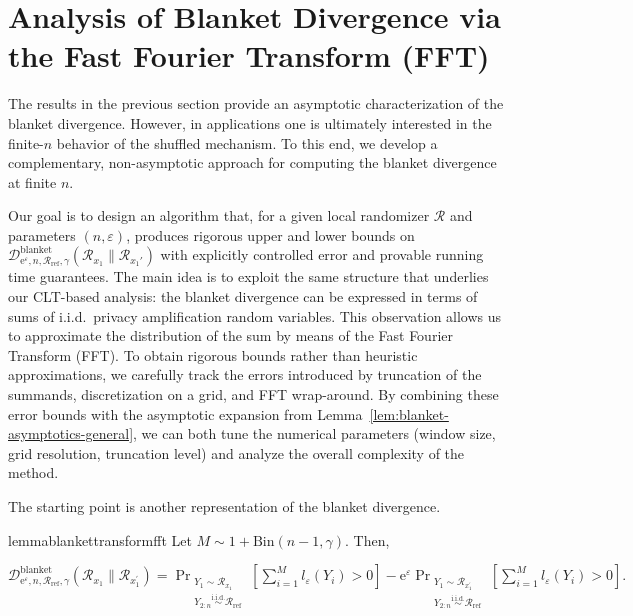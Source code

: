 \documentclass{article}
\theoremstyle{plain}
\theoremstyle{definition}
\begin{document}
\section{Analysis of Blanket Divergence via the Fast Fourier Transform (FFT)}

The results in the previous section provide an asymptotic characterization of the blanket divergence. 
However, in applications one is ultimately interested in the finite-$n$ behavior of the shuffled mechanism.
To this end, we develop a complementary, non-asymptotic approach for computing the blanket divergence at finite $n$.


Our goal is to design an algorithm that, for a given local randomizer
$\mathcal R$ and parameters $(n,\varepsilon)$, produces rigorous upper and
lower bounds on
$\mathcal D^{\mathrm{blanket}}_{\mathrm e^\varepsilon,n,\mathcal R_{\mathrm{ref}},\gamma}
(\mathcal R_{x_1}\|\mathcal R_{x_1'})$ with explicitly controlled error and
provable running time guarantees. 
The main idea is to exploit the same
structure that underlies our CLT-based analysis: the blanket divergence can be
expressed in terms of sums of i.i.d.\ privacy amplification random variables.
This observation allows us to approximate the distribution of the sum by means
of the Fast Fourier Transform (FFT). 
To obtain rigorous bounds rather than
heuristic approximations, we carefully track the errors introduced by
truncation of the summands, discretization on a grid, and FFT wrap-around.
By combining these error bounds with the asymptotic expansion from
Lemma~\ref{lem:blanket-asymptotics-general}, we can both tune the numerical
parameters (window size, grid resolution, truncation level) and analyze the
overall complexity of the method.

The starting point is another representation of the blanket divergence.


\begin{restatable}{lemma}{blankettransformfft}
\label{lemma:trans_fft}
Let $M\sim 1+\mathrm{Bin}(n-1, \gamma)$. Then,


$
\mathcal{D}_{\mathrm{e}^\varepsilon,n,\mathcal{R}_\mathrm{ref},\gamma}^\mathrm{blanket}(\mathcal{R}_{x_1} \| \mathcal{R}_{x_1^\prime})=\Pr_{\substack{Y_1\sim\mathcal{R}_{x_1} \\ Y_{2:n}\stackrel{\mathrm{i.i.d.}}{\sim} \mathcal{R}_\mathrm{ref}}}\left[\sum_{i=1}^{M} l_\varepsilon(Y_i)>0\right]-\mathrm{e}^\varepsilon\Pr_{\substack{Y_1\sim\mathcal{R}_{x_1^\prime} \\ Y_{2:n}\stackrel{\mathrm{i.i.d.}}{\sim} \mathcal{R}_\mathrm{ref}}}\left[\sum_{i=1}^{M} l_\varepsilon(Y_i)>0\right].
$
\end{restatable}
\end{document}
